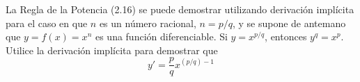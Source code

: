 \item La Regla de la Potencia (2.16) se puede demostrar utilizando derivación implícita para el caso en que $n$ es un número racional, $n = p/q$, y se supone de antemano que $y = f(x) = x^n$ es una función diferenciable. Si $y = x^{p/q}$, entonces $y^q = x^p$. Utilice la derivación implícita para demostrar que
$$y' = \frac{p}{q}x^{(p/q)-1}$$
